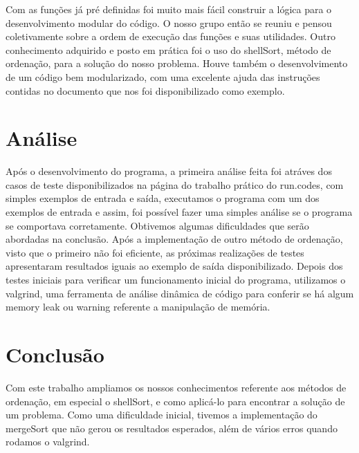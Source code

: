 \documentclass{article}
\begin{document}
Com as funções já pré definidas foi muito mais fácil construir a lógica para o desenvolvimento modular do código. O nosso grupo então se reuniu e pensou coletivamente sobre a ordem de execução das funções e suas utilidades.
Outro conhecimento adquirido e posto em prática foi o uso do shellSort, método de ordenação, para a solução do nosso problema. Houve também o desenvolvimento de um código bem modularizado, com uma excelente ajuda das instruções contidas no documento que nos foi disponibilizado como exemplo.

\section{Análise}

Após o desenvolvimento do programa, a primeira análise feita foi atráves dos casos de teste disponibilizados na página do trabalho prático do run.codes, com simples exemplos de entrada e saída, executamos o programa com um dos exemplos de entrada e assim, foi possível fazer uma simples análise se o programa se comportava corretamente. Obtivemos algumas dificuldades que serão abordadas na conclusão. Após a implementação de outro método de ordenação, visto que o primeiro não foi eficiente, as próximas realizações de testes apresentaram resultados iguais ao exemplo de saída disponibilizado.
Depois dos testes iniciais para verificar um funcionamento inicial do programa, utilizamos o valgrind, uma ferramenta de análise dinâmica de código para conferir se há algum memory leak ou warning referente a manipulação de memória.


\section{Conclusão}

Com este trabalho ampliamos os nossos conhecimentos referente aos métodos de ordenação, em especial o shellSort, e como aplicá-lo para encontrar a solução de um problema.
Como uma dificuldade inicial, tivemos a implementação do mergeSort que não gerou os resultados esperados, além de vários erros quando rodamos o valgrind.
\end{document}
